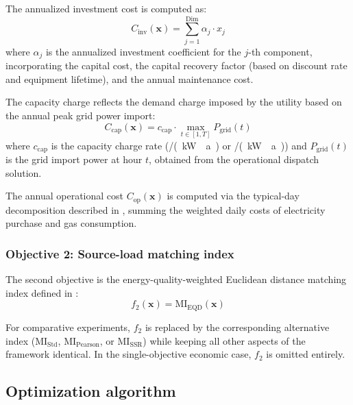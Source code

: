 The annualized investment cost is computed as:
\begin{equation}
    C_{\text{inv}}(\mathbf{x}) = \sum_{j=1}^{\text{Dim}} \alpha_j \cdot x_j
    \label{eq:invest}
\end{equation}
where $\alpha_j$ is the annualized investment coefficient for the $j$-th component, incorporating the capital cost, the capital recovery factor (based on discount rate and equipment lifetime), and the annual maintenance cost.

The capacity charge reflects the demand charge imposed by the utility based on the annual peak grid power import:
\begin{equation}
    C_{\text{cap}}(\mathbf{x}) = c_{\text{cap}} \cdot \max_{t \in [1,T]} P_{\text{grid}}(t)
    \label{eq:cap_charge}
\end{equation}
where $c_{\text{cap}}$ is the capacity charge rate (\si{\text{\euro}/(kW \cdot a)} or \si{\text{\textyen}/(kW \cdot a)}) and $P_{\text{grid}}(t)$ is the grid import power at hour $t$, obtained from the operational dispatch solution.

The annual operational cost $C_{\text{op}}(\mathbf{x})$ is computed via the typical-day decomposition described in , summing the weighted daily costs of electricity purchase and gas consumption.

\subsubsection{Objective 2: Source-load matching index}

The second objective is the energy-quality-weighted Euclidean distance matching index defined in :
\begin{equation}
    f_2(\mathbf{x}) = \text{MI}_{\text{EQD}}(\mathbf{x})
    \label{eq:obj2}
\end{equation}

For comparative experiments, $f_2$ is replaced by the corresponding alternative index ($\text{MI}_{\text{Std}}$, $\text{MI}_{\text{Pearson}}$, or $\text{MI}_{\text{SSR}}$) while keeping all other aspects of the framework identical. In the single-objective economic case, $f_2$ is omitted entirely.

\subsection{Optimization algorithm}
\label{sec:algorithm}

